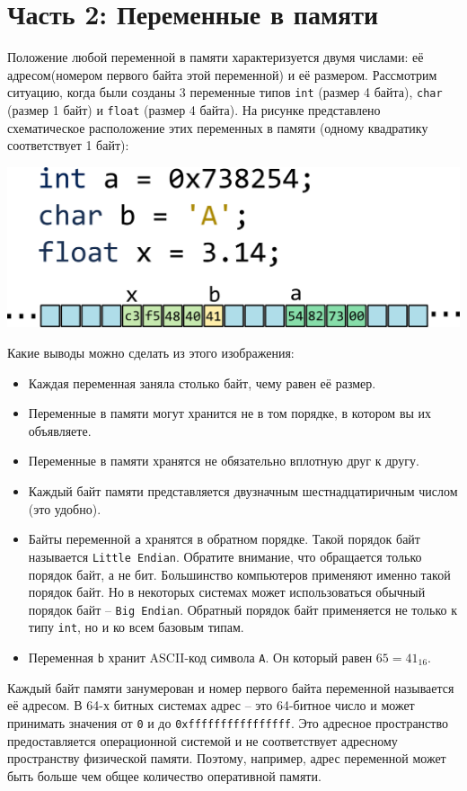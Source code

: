 \documentclass{article}
\begin{document}
\section*{Часть 2: Переменные в памяти}
Положение любой переменной в памяти характеризуется двумя числами: её адресом(номером первого байта этой переменной) и её размером. Рассмотрим ситуацию, когда были созданы 3 переменные типов \texttt{int} (размер 4 байта), \texttt{char} (размер 1 байт) и \texttt{float} (размер 4 байта).
На рисунке представлено схематическое расположение этих переменных в памяти (одному квадратику соответствует 1 байт):

\begin{center}
\includegraphics[scale=1]{../images/memory/memory_2_different_types.png}
\end{center}
Какие выводы можно сделать из этого изображения:
\begin{itemize}
\item Каждая переменная заняла столько байт, чему равен её размер.
\item Переменные в памяти могут хранится не в том порядке, в котором вы их объявляете.
\item Переменные в памяти хранятся не обязательно вплотную друг к другу.
\item Каждый байт памяти представляется двузначным шестнадцатиричным числом (это удобно).
\item Байты переменной \texttt{a} хранятся в обратном порядке. Такой порядок байт называется \texttt{Little Endian}.  Обратите внимание, что обращается только порядок байт, а не бит. Большинство компьютеров применяют именно такой порядок байт. Но в некоторых системах может использоваться обычный порядок байт -- \texttt{Big Endian}. Обратный порядок байт применяется не только к типу \texttt{int}, но и ко всем базовым типам.
\item Переменная \texttt{b} хранит ASCII-код символа \texttt{A}. Он который равен $65 = 41_{16}$.
\end{itemize}
Каждый байт памяти занумерован и номер первого байта переменной называется её адресом. В 64-х битных системах адрес -- это 64-битное число и может принимать значения от \texttt{0} и до \texttt{0xffffffffffffffff}.  Это адресное пространство предоставляется операционной системой  и не соответствует адресному пространству физической памяти. Поэтому, например, адрес переменной может быть больше чем общее количество оперативной памяти.
\end{document}
